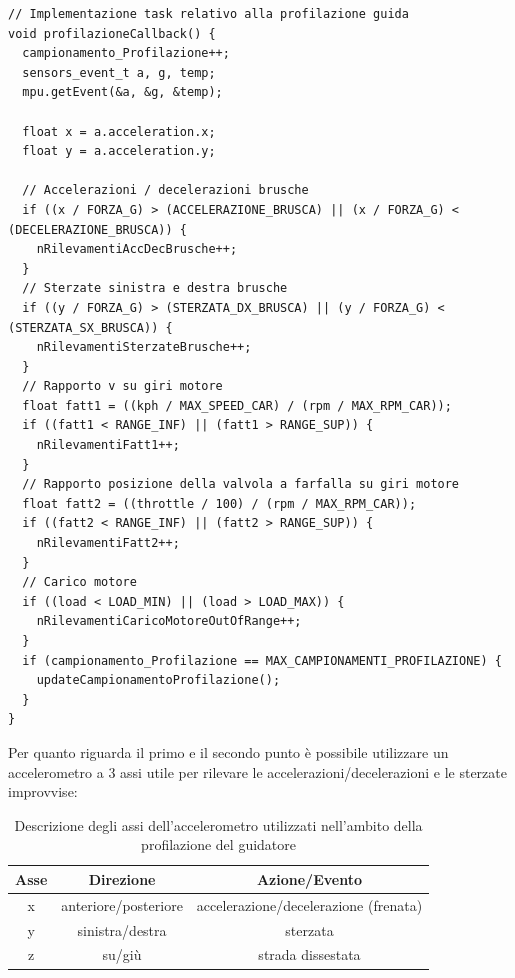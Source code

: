 \documentclass[12pt, a4paper, italian]{report}
\numberwithin{figure}{chapter}
\numberwithin{table}{chapter}
\begin{document}
\begin{lstlisting}
// Implementazione task relativo alla profilazione guida
void profilazioneCallback() {
  campionamento_Profilazione++;
  sensors_event_t a, g, temp;
  mpu.getEvent(&a, &g, &temp);

  float x = a.acceleration.x;
  float y = a.acceleration.y;

  // Accelerazioni / decelerazioni brusche
  if ((x / FORZA_G) > (ACCELERAZIONE_BRUSCA) || (x / FORZA_G) < (DECELERAZIONE_BRUSCA)) {
    nRilevamentiAccDecBrusche++;
  }
  // Sterzate sinistra e destra brusche
  if ((y / FORZA_G) > (STERZATA_DX_BRUSCA) || (y / FORZA_G) < (STERZATA_SX_BRUSCA)) {
    nRilevamentiSterzateBrusche++;
  }
  // Rapporto v su giri motore
  float fatt1 = ((kph / MAX_SPEED_CAR) / (rpm / MAX_RPM_CAR));
  if ((fatt1 < RANGE_INF) || (fatt1 > RANGE_SUP)) {
    nRilevamentiFatt1++;
  }
  // Rapporto posizione della valvola a farfalla su giri motore
  float fatt2 = ((throttle / 100) / (rpm / MAX_RPM_CAR));
  if ((fatt2 < RANGE_INF) || (fatt2 > RANGE_SUP)) {
    nRilevamentiFatt2++;
  }
  // Carico motore
  if ((load < LOAD_MIN) || (load > LOAD_MAX)) {
    nRilevamentiCaricoMotoreOutOfRange++;
  }
  if (campionamento_Profilazione == MAX_CAMPIONAMENTI_PROFILAZIONE) {  
    updateCampionamentoProfilazione();
  }
}
\end{lstlisting}
\vspace{0.5cm}
Per quanto riguarda il primo e il secondo punto è possibile utilizzare un accelerometro a 3 assi utile per rilevare  le accelerazioni/decelerazioni e le sterzate improvvise: 

\begin{table}[h!]
  \centering
  \begin{tabular}{|c|c|c|}
    \hline
    \textbf{Asse} & \textbf{Direzione} & \textbf{Azione/Evento} \\
    \hline
    x & anteriore/posteriore & accelerazione/decelerazione (frenata) \\
    \hline
    y & sinistra/destra & sterzata \\
    \hline
    z & su/giù & strada dissestata \\
    \hline
  \end{tabular}
  \caption{Descrizione degli assi dell'accelerometro utilizzati nell'ambito della profilazione del guidatore}
  \label{tab:tabellaAccelerometro}
\end{table}
\end{document}
